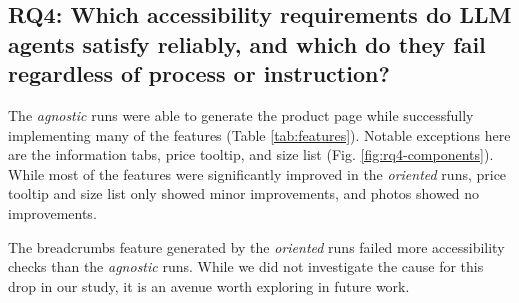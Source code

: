 \documentclass[conference]{IEEEtran}
\begin{document}
\subsection{RQ4: Which accessibility requirements do LLM agents satisfy reliably, and which do they fail regardless of process or instruction?}

The \textit{agnostic} runs were able to generate the product page while
successfully implementing many of the features (Table \ref{tab:features}). Notable
exceptions here are the information tabs, price tooltip, and size list (Fig. \ref{fig:rq4-components}).
While most of the features were significantly improved in the \textit{oriented}
runs, price tooltip and size list only showed minor improvements, and photos showed no improvements. 

The breadcrumbs feature generated by the \textit{oriented} runs failed more accessibility checks than the \textit{agnostic} runs. While we
did not investigate the cause for this drop in our study, it is an avenue worth exploring in future work. 
\end{document}
